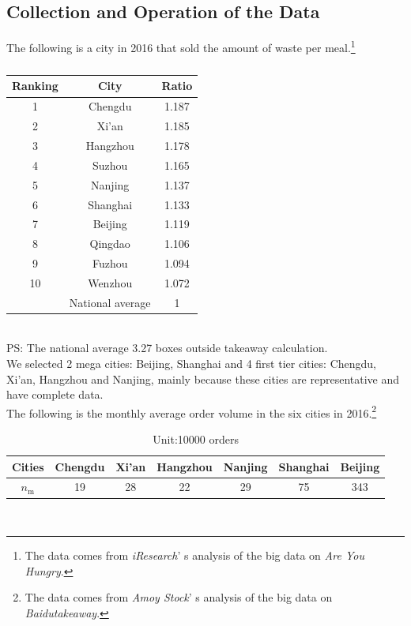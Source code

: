 \documentclass[UTF8]{article}
\begin{document}
\subsection{Collection and Operation of the Data}
\indent The following is a city in 2016 that sold the amount of waste per meal.\footnote{The data comes from \textit{iResearch}' s analysis of the big data on \textit{Are You Hungry}.}\\
\begin{table}[h]
\caption{}
\begin{center}
\begin{tabular}{ccc}
\hline
Ranking &City&Ratio\\
\hline
1&Chengdu&1.187\\
\hline
2&Xi’an&1.185\\
\hline
3&Hangzhou&1.178\\
\hline
4&Suzhou&1.165\\
\hline
5&Nanjing&1.137\\
\hline
6&Shanghai&1.133\\
\hline
7&Beijing&1.119\\
\hline
8&Qingdao&1.106\\
\hline
9&Fuzhou&1.094\\
\hline
10&Wenzhou&1.072\\
\hline
&National average&1\\
\hline
\end{tabular}
\end{center}
\end{table}\\
\indent PS: The national average 3.27 boxes outside takeaway calculation.\\
\indent We selected 2 mega cities: Beijing, Shanghai and 4 first tier cities: Chengdu, Xi'an, Hangzhou and Nanjing, mainly because these cities are representative and have complete data.\\
\indent The following is the monthly average order volume in the six cities in 2016.\footnote{The data comes from \textit{Amoy Stock}' s analysis of the big data on \textit{Baidutakeaway}.}\\
\begin{table}[h]
\caption{Unit:10000 orders}
\begin{center}
\begin{tabular}{ccccccc}
\hline
Cities&Chengdu&Xi'an&Hangzhou&Nanjing&Shanghai&Beijing\\
\hline
\(n_{\textrm{m}}\)&19&28&22&29&75&343\\
\hline
\end{tabular}
\end{center}
\end{table}\\
\end{document}
